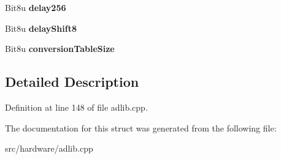 \begin{DoxyCompactItemize}
\item 
\hypertarget{structAdlib_1_1RawHeader_a1fd40a8fe5a9771c58e969db0a9e0386}{Bit8u {\bfseries delay256}}\label{structAdlib_1_1RawHeader_a1fd40a8fe5a9771c58e969db0a9e0386}

\item 
\hypertarget{structAdlib_1_1RawHeader_a73598973dbc467633ad076135d19223a}{Bit8u {\bfseries delay\-Shift8}}\label{structAdlib_1_1RawHeader_a73598973dbc467633ad076135d19223a}

\item 
\hypertarget{structAdlib_1_1RawHeader_a11b787b47fad2e30661ff1846811c823}{Bit8u {\bfseries conversion\-Table\-Size}}\label{structAdlib_1_1RawHeader_a11b787b47fad2e30661ff1846811c823}

\end{DoxyCompactItemize}


\subsection{Detailed Description}


Definition at line 148 of file adlib.\-cpp.



The documentation for this struct was generated from the following file\-:\begin{DoxyCompactItemize}
\item 
src/hardware/adlib.\-cpp\end{DoxyCompactItemize}
